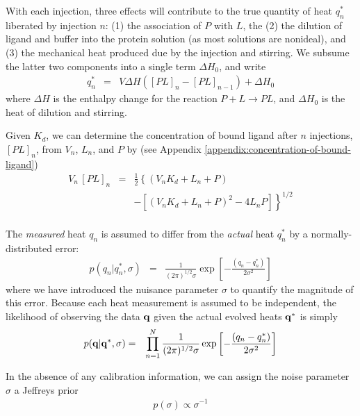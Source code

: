 \documentclass[aps,pre,twocolumn,nofootinbib,superscriptaddress,linenumbers]{revtex4-1}
\newcommand{\bfm}[1]{{\bf #1}}
\begin{document}
With each injection, three effects will contribute to the true quantity of heat $q_n^*$ liberated by injection $n$: (1) the association of $P$ with $L$, the (2) the dilution of ligand and buffer into the protein solution (as most solutions are nonideal), and (3) the mechanical heat produced due by the injection and stirring.
We subsume the latter two components into a single term $\Delta H_0$, and write
\begin{eqnarray}
q_n^* &=& V \Delta H \left( [PL]_n - [PL]_{n-1} \right) + \Delta H_0 \label{equation:liberated-heat}
\end{eqnarray}
where $\Delta H$ is the enthalpy change for the reaction $P + L \rightarrow PL$, and $\Delta H_0$ is the heat of dilution and stirring.

Given $K_d$, we can determine the concentration of bound ligand after $n$ injections, $[PL]_n$, from $V_n$, $L_n$, and $P$ by (see Appendix \ref{appendix:concentration-of-bound-ligand})
\begin{eqnarray}
V_n \, [PL]_n &=& \frac{1}{2} \left\{ (V_n K_d + L_n + P) \right. \nonumber \\
&&- \left. \left[ (V_n K_d + L_n + P)^2 - 4 L_n P \right] \right\}^{1/2} \nonumber \\
\end{eqnarray}

The \emph{measured} heat $q_n$ is assumed to differ from the \emph{actual} heat $q_n^*$ by a normally-distributed error:
\begin{eqnarray}
p(q_n | q_n^*, \sigma) &=& \frac{1}{(2 \pi)^{1/2} \sigma} \exp\left[- \frac{(q_n - q_n^*)}{2 \sigma^2}\right]
\end{eqnarray}
where we have introduced the nuisance parameter $\sigma$ to quantify the magnitude of this error.
Because each heat measurement is assumed to be independent, the likelihood of observing the data $\bfm{q}$ given the actual evolved heats $\bfm{q}^*$ is simply
\begin{eqnarray}
p(\bfm{q} | \bfm{q}^*, \sigma) &=& \prod_{n=1}^N \frac{1}{(2 \pi)^{1/2} \sigma} \exp\left[- \frac{(q_n - q_n^*)}{2 \sigma^2}\right]
\end{eqnarray}

In the absence of any calibration information, we can assign the noise parameter $\sigma$ a Jeffreys prior
\begin{eqnarray}
p(\sigma) \propto \sigma^{-1}
\end{eqnarray}
\end{document}
